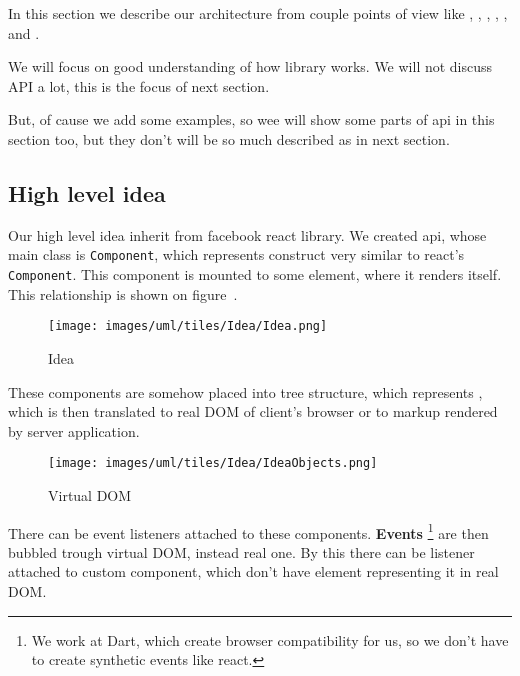 \documentclass[oneside, 12pt]{book}
\begin{document}
  In this section we describe our architecture from couple points of view like , 
  , 
  , 
  , 
  , 
   and
  .

  We will focus on good understanding of how library works. 
  We will not discuss API a lot, this is the focus of next section. 

  But, of cause we add some examples, so wee will show some parts of api in this section too, 
  but they don't will be so much described as in next section.

  \subsection{High level idea}\label{subsec:our-architecture-idea}
    Our high level idea inherit from facebook react library. 
    We created api, whose main class is \texttt{Component}, which represents construct very similar to react's \texttt{Component}.
    This component is mounted to some element, where it renders itself. 
    This relationship is shown on figure~.
    \begin{figure}[h]
    \centering  
      \texttt{[image: images/uml/tiles/Idea/Idea.png]}
      \caption{Idea}
      \label{img:library-idea}
    \end{figure}

    These components are somehow placed into tree structure, which represents \mbox{\textbf{}}, 
    which is then translated to real DOM of client's browser or to markup rendered by server application.

    \begin{figure}[h]
    \centering  
      \texttt{[image: images/uml/tiles/Idea/IdeaObjects.png]}
      \caption{Virtual DOM}
      \label{img:library-idea-virtual-dom}
    \end{figure}
    There can be event listeners attached to these components. 
    \textbf{Events} \footnote{We work at Dart, which create browser compatibility for us, so we don't have to create synthetic events like react.}
    are then bubbled trough virtual DOM, instead real one.
    By this there can be listener attached to custom component, which don't have element representing it in real DOM.
\end{document}

